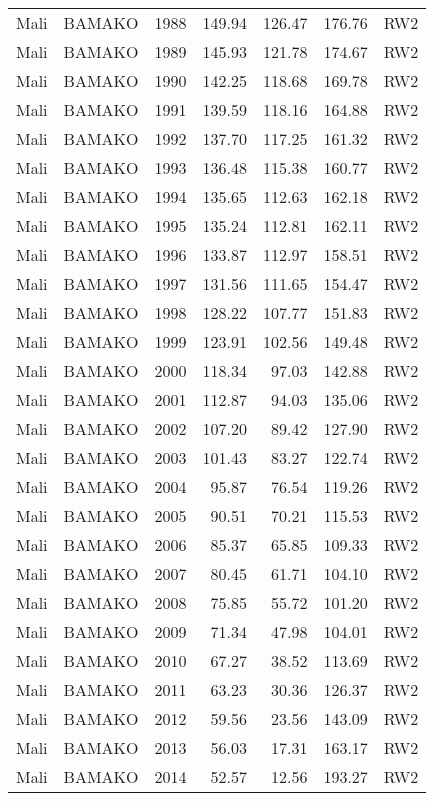 \begin{longtable}{lllrrrl}
  Mali & BAMAKO & 1988 & 149.94 & 126.47 & 176.76 & RW2 \\ 
  Mali & BAMAKO & 1989 & 145.93 & 121.78 & 174.67 & RW2 \\ 
  Mali & BAMAKO & 1990 & 142.25 & 118.68 & 169.78 & RW2 \\ 
  Mali & BAMAKO & 1991 & 139.59 & 118.16 & 164.88 & RW2 \\ 
  Mali & BAMAKO & 1992 & 137.70 & 117.25 & 161.32 & RW2 \\ 
  Mali & BAMAKO & 1993 & 136.48 & 115.38 & 160.77 & RW2 \\ 
  Mali & BAMAKO & 1994 & 135.65 & 112.63 & 162.18 & RW2 \\ 
  Mali & BAMAKO & 1995 & 135.24 & 112.81 & 162.11 & RW2 \\ 
  Mali & BAMAKO & 1996 & 133.87 & 112.97 & 158.51 & RW2 \\ 
  Mali & BAMAKO & 1997 & 131.56 & 111.65 & 154.47 & RW2 \\ 
  Mali & BAMAKO & 1998 & 128.22 & 107.77 & 151.83 & RW2 \\ 
  Mali & BAMAKO & 1999 & 123.91 & 102.56 & 149.48 & RW2 \\ 
  Mali & BAMAKO & 2000 & 118.34 & 97.03 & 142.88 & RW2 \\ 
  Mali & BAMAKO & 2001 & 112.87 & 94.03 & 135.06 & RW2 \\ 
  Mali & BAMAKO & 2002 & 107.20 & 89.42 & 127.90 & RW2 \\ 
  Mali & BAMAKO & 2003 & 101.43 & 83.27 & 122.74 & RW2 \\ 
  Mali & BAMAKO & 2004 & 95.87 & 76.54 & 119.26 & RW2 \\ 
  Mali & BAMAKO & 2005 & 90.51 & 70.21 & 115.53 & RW2 \\ 
  Mali & BAMAKO & 2006 & 85.37 & 65.85 & 109.33 & RW2 \\ 
  Mali & BAMAKO & 2007 & 80.45 & 61.71 & 104.10 & RW2 \\ 
  Mali & BAMAKO & 2008 & 75.85 & 55.72 & 101.20 & RW2 \\ 
  Mali & BAMAKO & 2009 & 71.34 & 47.98 & 104.01 & RW2 \\ 
  Mali & BAMAKO & 2010 & 67.27 & 38.52 & 113.69 & RW2 \\ 
  Mali & BAMAKO & 2011 & 63.23 & 30.36 & 126.37 & RW2 \\ 
  Mali & BAMAKO & 2012 & 59.56 & 23.56 & 143.09 & RW2 \\ 
  Mali & BAMAKO & 2013 & 56.03 & 17.31 & 163.17 & RW2 \\ 
  Mali & BAMAKO & 2014 & 52.57 & 12.56 & 193.27 & RW2 \\ 

\end{longtable}
